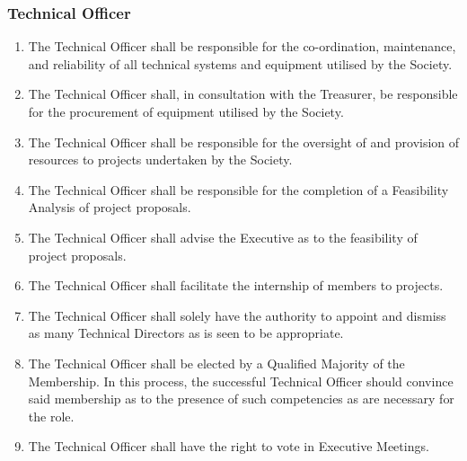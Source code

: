 \documentclass{scrartcl}
\begin{document}
            \subsubsection{Technical Officer}
                \label{executive--positions--technical-officer}
                \begin{enumerate}
                    \item The Technical Officer shall be responsible for the co-ordination, maintenance, and reliability of all technical systems and equipment utilised by the Society.
                    \item The Technical Officer shall, in consultation with the Treasurer, be responsible for the procurement of equipment utilised by the Society.
                    \item The Technical Officer shall be responsible for the oversight of and provision of resources to projects undertaken by the Society.
                    \item The Technical Officer shall be responsible for the completion of a Feasibility Analysis of project proposals.
                    \item The Technical Officer shall advise the Executive as to the feasibility of project proposals.
                    \item The Technical Officer shall facilitate the internship of members to projects.
                    \item The Technical Officer shall solely have the authority to appoint and dismiss as many Technical Directors as is seen to be appropriate.
                    \item The Technical Officer shall be elected by a Qualified Majority of the Membership.
                        \subitem In this process, the successful Technical Officer should convince said membership as to the presence of such competencies as are necessary for the role.
                    \item The Technical Officer shall have the right to vote in Executive Meetings.
                \end{enumerate}
\end{document}
